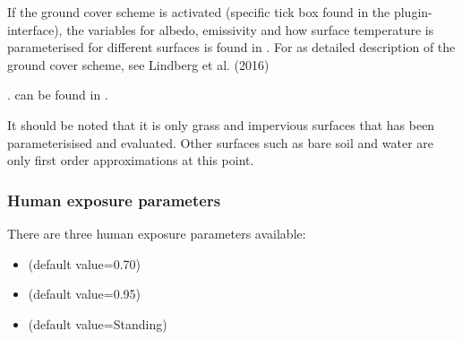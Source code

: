 \documentclass[letterpaper,10pt,english]{sphinxmanual}
\begin{document}
If the ground cover scheme is activated (specific tick box found in the
plugin-interface), the variables for albedo, emissivity and how surface
temperature is parameterised for different surfaces is found in
. For as detailed description of the
ground cover scheme, see Lindberg et al. (2016)  %
\begin{footnote}[5]\sphinxAtStartFootnote
%
\end{footnote}.
 can be found in
.

It should be noted that it is only grass and impervious surfaces that
has been parameterisised and evaluated. Other surfaces such as bare soil
and water are only first order approximations at this point.


\subsubsection{Human exposure parameters}
\label{\detokenize{OtherManuals/SOLWEIG:human-exposure-parameters}}
There are three human exposure parameters available:
\begin{itemize}
\item {} 
 (default value=0.70)

\item {} 
 (default value=0.95)

\item {} 
 (default value=Standing)

\end{itemize}
\end{document}
